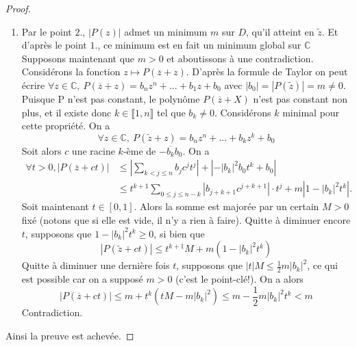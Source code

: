 \documentclass[french]{book}
\newcommand{\C}{\mathbb{C}}
\theoremstyle{plain}
\theoremstyle{definition}
\theoremstyle{remark}
\begin{document}
\begin{proof}
\begin{enumerate}
	$$|\tilde{z}^{j}-z_{k}^{j}|\leq|\tilde{z}-z_{k}|\cdot(|\tilde{z}|^{j-1}+|\tilde{z}|^{j-2}|z_{k}|+...+|z_{k}|^{j-1})\leq|\tilde{z}-z_{k}|\cdot jR^{j-1}$$ ce qui permet de conclure.
	\item Par le point $2.$, $|P(z)|$ admet un minimum $m$ sur $D$, qu'il atteint en $\tilde{z}$. Et d'après le point $1.$, ce minimum est en fait un minimum global sur $\C$ Supposons maintenant que $m>0$ et aboutissons à une contradiction.\\
	Considérons la fonction $z\mapsto P(\overline{z}+z).$ D'après la formule de Taylor on peut écrire
	$\forall z\in\mathbb{C},\ P(\overline{z}+z)=b_{n}z^{n}+...+b_{1}z+b_{0}$
	avec $|b_{0}|=|P(\tilde{z})|=m\neq0.$ Puisque P n'est pas constant, le polynôme $P(\overline{z}+X)$ n'est pas constant non plus, et il existe donc $k\in\llbracket1,n\rrbracket$ tel que $b_{k}\neq0$. Considérons $k$ minimal pour cette propriété. On a $$\forall z\in\mathbb{C},\ P(\tilde{z}+z)=b_{n}z^{n}+...+b_{k}z^{k}+b_{0}$$
	Soit alors $c$ une racine $k$-ème de $-\overline{b_{k}}b_{0}$. On a
	\begin{align*}
		\forall t>0, |P(\overline{z}+ct)| &\leqslant \left|\sum_{k<j\leqslant n}b_{j}c^{j}t^{j}\right| + \left|-\left|b_{k}\right|^{2}b_{0}t^{k}+b_{0}\right| \\
		&\leqslant t^{k+1}\sum_{0\leqslant j\leqslant n-k}|b_{j+k+1}c^{j+k+1}|\cdot t^{j} + m\left|1-\left|b_{k}\right|^{2}t^{k}\right|.
	\end{align*}
	Soit maintenant $t\in[0,1]$. Alors la somme est majorée par un certain $M>0$ fixé (notons que si elle est vide, il n'y a rien à faire). Quitte à diminuer encore $t$, supposons que $1-\left|b_{k}\right|^{2}t^{k}\geqslant0$, si bien que $$|P(\tilde{z}+ct)|\leqslant t^{k+1}M+m\left(1-\left|b_{k}\right|^{2}t^{k}\right)$$
	Quitte à diminuer une dernière fois $t$, supposons que $|t|M\leq\frac{1}{2}m\left|b_{k}\right|^{2}$, ce qui est possible car on a supposé $m>0$ (c'est le point-clé!). On a alors $$|P(\overline{z}+ct)|\leqslant m+t^{k}\left(tM-m\left|b_{k}\right|^{2}\right)\leqslant m-\frac{1}{2}m\left|b_{k}\right|^{2}t^{k}<m$$
	Contradiction.
\end{enumerate}
Ainsi la preuve est achevée.
\end{proof}
\end{document}
